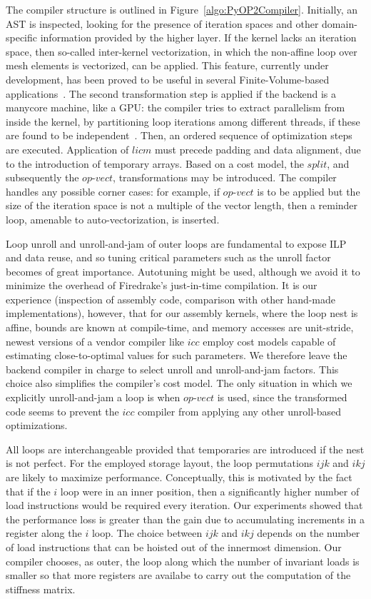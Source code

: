 \documentclass[conference]{IEEEtran}
\begin{document}
The compiler structure is outlined in Figure~\ref{algo:PyOP2Compiler}. Initially, an AST is inspected, looking for the presence of iteration spaces and other domain-specific information provided by the higher layer. If the kernel lacks an iteration space, then so-called inter-kernel vectorization, in which the non-affine loop over mesh elements is vectorized, can be applied. This feature, currently under development, has been proved to be useful in several Finite-Volume-based applications~\cite{reguly-inter-kernel}. The second transformation step is applied if the backend is a manycore machine, like a GPU: the compiler tries to extract parallelism from inside the kernel, by partitioning loop iterations among different threads, if these are found to be independent~\cite{quadrature-cuda}. Then, an ordered sequence of optimization steps are executed. Application of $licm$ must precede padding and data alignment, due to the introduction of temporary arrays. Based on a cost model, the $split$, and subsequently the $op$-$vect$, transformations may be introduced. The compiler handles any possible corner cases: for example, if $op$-$vect$ is to be applied but the size of the iteration space is not a multiple of the vector length, then a reminder loop, amenable to auto-vectorization, is inserted.

Loop unroll and unroll-and-jam of outer loops are fundamental to expose ILP and data reuse, and so tuning critical parameters such as the unroll factor becomes of great importance. Autotuning might be used, although we avoid it to minimize the overhead of Firedrake's just-in-time compilation. It is our experience (inspection of assembly code, comparison with other hand-made implementations), however, that for our assembly kernels, where the loop nest is affine, bounds are known at compile-time, and memory accesses are unit-stride, newest versions of a vendor compiler like $icc$ employ cost models capable of estimating close-to-optimal values for such parameters.  We therefore leave the backend compiler in charge to select unroll and unroll-and-jam factors. This choice also simplifies the compiler's cost model. The only situation in which we explicitly unroll-and-jam a loop is when $op$-$vect$ is used, since the transformed code seems to prevent the $icc$ compiler from applying any other unroll-based optimizations.

All loops are interchangeable provided that temporaries are introduced if the nest is not perfect. For the employed storage layout, the loop permutations $ijk$ and $ikj$ are likely to maximize performance. Conceptually, this is motivated by the fact that if the $i$ loop were in an inner position, then a significantly higher number of load instructions would be required every iteration. Our experiments showed that the performance loss is greater than the gain due to accumulating increments in a register along the $i$ loop. The choice between $ijk$ and $ikj$ depends on the number of load instructions that can be hoisted out of the innermost dimension. Our compiler chooses, as outer, the loop along which the number of invariant loads is smaller so that more registers are availabe to carry out the computation of the stiffness matrix. 
\end{document}
